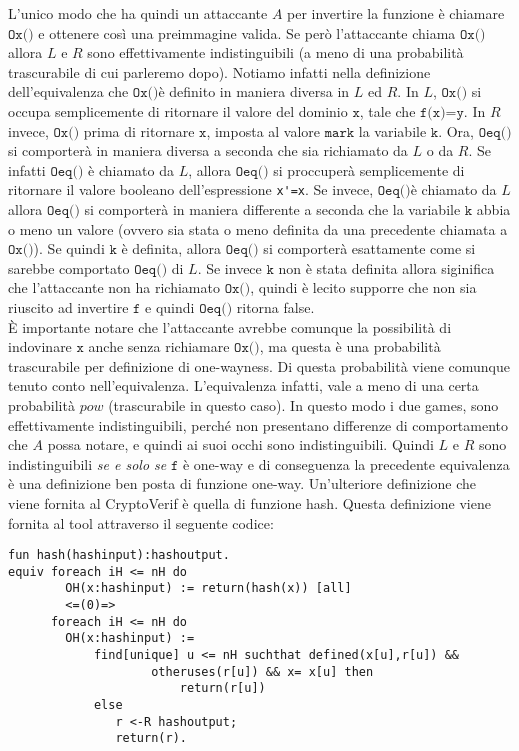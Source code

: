 \documentclass[a4paper,openright,twoside,12pt]{report}
\begin{document}
L'unico modo che ha quindi un attaccante $A$ per invertire la funzione \`e chiamare $\texttt{Ox()}$ e ottenere cos\`i una preimmagine valida. 
Se però l'attaccante chiama $\texttt{Ox()}$ allora $L$ e $R$ sono effettivamente indistinguibili (a meno di una probabilit\`a trascurabile di cui parleremo dopo).
Notiamo infatti nella definizione dell'equivalenza che  $\texttt{Ox()}$\`e definito in maniera diversa in $L$ ed $R$.
In $L$, $\texttt{Ox()}$ si occupa semplicemente di ritornare il valore del dominio $\texttt{x}$, tale che $\texttt{f(x)=y}$. 
In $R$ invece, $\texttt{Ox()}$ prima di ritornare $\texttt{x}$, imposta al valore $\texttt{mark}$ la variabile $\texttt{k}$.
Ora, $\texttt{Oeq()}$ si comporter\`a in maniera diversa a seconda che sia richiamato da $L$ o da $R$.
Se infatti $\texttt{Oeq()}$ \`e chiamato da $L$, allora $\texttt{Oeq()}$ si proccuper\`a semplicemente di ritornare il valore booleano dell'espressione \verb!x'=x!.
Se invece,  $\texttt{Oeq()}$\`e chiamato da $L$ allora $\texttt{Oeq()}$ si comporter\`a in maniera differente a seconda che la variabile $\texttt{k}$ abbia o meno un valore 
(ovvero sia stata o meno definita da una precedente chiamata a $\texttt{Ox()}$). Se quindi $\texttt{k}$ \`e definita, allora $\texttt{Oeq()}$ si comporter\`a esattamente come si sarebbe comportato $\texttt{Oeq()}$  di $L$.
Se invece $\texttt{k}$ non \`e stata definita allora siginifica che l'attaccante non ha richiamato $\texttt{Ox()}$, quindi \`e lecito supporre che non sia riuscito ad invertire $\texttt{f}$ e quindi $\texttt{Oeq()}$ ritorna false.\\
\`E importante notare che l'attaccante avrebbe comunque la possibilit\`a di indovinare $\texttt{x}$ anche senza richiamare $\texttt{Ox()}$, ma questa \`e una probabilit\`a trascurabile per definizione di one-wayness. 
Di questa probabilit\`a viene comunque tenuto conto nell'equivalenza. L'equivalenza infatti, vale a meno di una certa probabilit\`a $pow$ (trascurabile in questo caso).
In questo modo i due games, sono effettivamente indistinguibili, perch\'e non presentano differenze di comportamento che $A$ possa notare, e quindi ai suoi occhi sono indistinguibili.
Quindi $L$ e $R$ sono indistinguibili \emph{se e solo se} $\texttt{f}$ \`e one-way e di conseguenza la precedente equivalenza \`e una definizione ben posta di funzione one-way.
Un'ulteriore definizione che viene fornita al CryptoVerif \`e quella di funzione hash. Questa definizione viene fornita al tool attraverso il seguente codice:
\begin{verbatim}
fun hash(hashinput):hashoutput.
equiv foreach iH <= nH do 
        OH(x:hashinput) := return(hash(x)) [all]
        <=(0)=>
      foreach iH <= nH do 
        OH(x:hashinput) :=
            find[unique] u <= nH suchthat defined(x[u],r[u]) && 
                    otheruses(r[u]) && x= x[u] then 
                        return(r[u]) 
            else 
               r <-R hashoutput; 
               return(r).
\end{verbatim}
\end{document}
